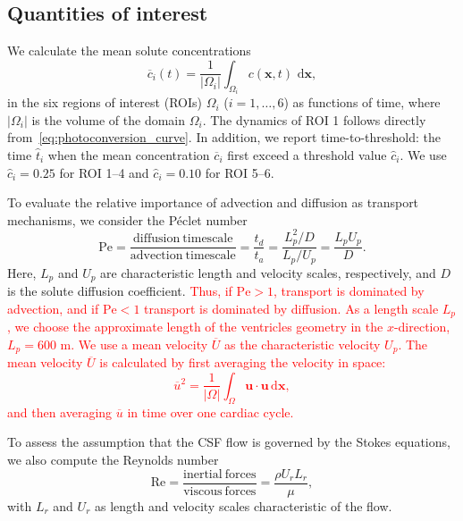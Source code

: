 \documentclass[fleqn]{wlscirep}
\newcommand{\cbar}{\overline{c}}
\newcommand{\dx}{\, \mathrm d\bm{x}}
\newcommand{\uu}{\mathbf{u}}
\newcommand{\xx}{\bm{x}}
\newcommand{\fixme}[1]{\textcolor{red}{#1}}
\begin{document}
\subsection*{Quantities of interest}
We calculate the mean solute concentrations
\begin{equation}
    \cbar_i(t) = \frac{1}{|\Omega_i|}\int_{\Omega_i} c(\xx, t)\,\dx,
    \label{eq:c_mean_i}
\end{equation}
in the six regions of interest (ROIs) $\Omega_i$ ($i = 1, \dots, 6$) as functions of time, where $|\Omega_i|$ is the volume of the domain $\Omega_i$. The dynamics of ROI 1 follows directly from~\eqref{eq:photoconversion_curve}. In addition, we report time-to-threshold: the time $\hat{t}_i$ when the mean concentration $\cbar_i$ first exceed a threshold value $\hat{c}_i$. We use $\hat{c}_i=0.25$ for ROI 1--4 and $\hat{c}_i=0.10$ for ROI 5--6.

To evaluate the relative importance of advection and diffusion as transport mechanisms, we consider the Péclet number
\begin{equation*}
    \mathrm{Pe} = \frac{\mathrm{diffusion \ timescale}}{\mathrm{advection \ timescale}} = \frac{t_d}{t_a} = \frac{L_p^2/D}{L_p/U_p} = \frac{L_p U_p}{D}.
\end{equation*}
Here, $L_p$ and $U_p$ are characteristic length and velocity scales, respectively, and $D$ is the solute diffusion coefficient. \fixme{Thus, if $\mathrm{Pe} > 1$, transport is dominated by advection, and if $\mathrm{Pe} < 1$ transport is dominated by diffusion. As a length scale $L_p$, we choose the approximate length of the ventricles geometry in the $x$-direction, $L_p=600$ \textmu m. We use a mean velocity $\overline{U}$ as the characteristic velocity $U_p$. The mean velocity $\overline{U}$ is calculated by first averaging the velocity in space:
\begin{equation*}
    \overline{u}^2 = \frac{1}{|\Omega|}\int_{\Omega}\uu\cdot\uu\dx,
\end{equation*}
and then averaging $\overline{u}$ in time over one cardiac cycle.}

To assess the assumption that the CSF flow is governed by the Stokes equations, we also compute the Reynolds number
\begin{equation*}
    \mathrm{Re} = \frac{\mathrm{inertial \ forces}}{\mathrm{viscous \ forces}} = \frac{\rho U_r L_r}{\mu},
\end{equation*}
with $L_r$ and $U_r$ as length and velocity scales characteristic of the flow. 
\end{document}
